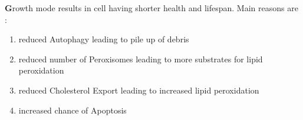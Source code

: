 \textbf Growth mode results in cell having shorter health and lifespan. Main reasons are :
\begin{enumerate}
\item reduced Autophagy leading to pile up of debris
\item reduced number of Peroxisomes leading to more substrates for lipid peroxidation
\item reduced Cholesterol Export leading to increased lipid peroxidation
\item increased chance of Apoptosis
\end{enumerate}